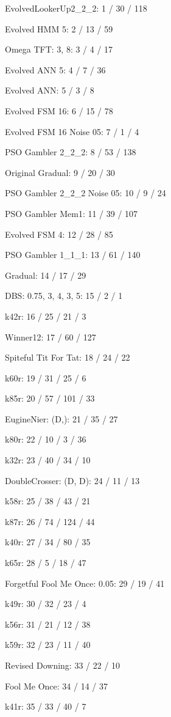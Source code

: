 \item EvolvedLookerUp2\_2\_2: 1 / 30 / 118
\item Evolved HMM 5: 2 / 13 / 59
\item Omega TFT: 3, 8: 3 / 4 / 17
\item Evolved ANN 5: 4 / 7 / 36
\item Evolved ANN: 5 / 3 / 8
\item Evolved FSM 16: 6 / 15 / 78
\item Evolved FSM 16 Noise 05: 7 / 1 / 4
\item PSO Gambler 2\_2\_2: 8 / 53 / 138
\item Original Gradual: 9 / 20 / 30
\item PSO Gambler 2\_2\_2 Noise 05: 10 / 9 / 24
\item PSO Gambler Mem1: 11 / 39 / 107
\item Evolved FSM 4: 12 / 28 / 85
\item PSO Gambler 1\_1\_1: 13 / 61 / 140
\item Gradual: 14 / 17 / 29
\item DBS: 0.75, 3, 4, 3, 5: 15 / 2 / 1
\item k42r: 16 / 25 / 21 / 3
\item Winner12: 17 / 60 / 127
\item Spiteful Tit For Tat: 18 / 24 / 22
\item k60r: 19 / 31 / 25 / 6
\item k85r: 20 / 57 / 101 / 33
\item EugineNier: (D,): 21 / 35 / 27
\item k80r: 22 / 10 / 3 / 36
\item k32r: 23 / 40 / 34 / 10
\item DoubleCrosser: (D, D): 24 / 11 / 13
\item k58r: 25 / 38 / 43 / 21
\item k87r: 26 / 74 / 124 / 44
\item k40r: 27 / 34 / 80 / 35
\item k65r: 28 / 5 / 18 / 47
\item Forgetful Fool Me Once: 0.05: 29 / 19 / 41
\item k49r: 30 / 32 / 23 / 4
\item k56r: 31 / 21 / 12 / 38
\item k59r: 32 / 23 / 11 / 40
\item Revised Downing: 33 / 22 / 10
\item Fool Me Once: 34 / 14 / 37
\item k41r: 35 / 33 / 40 / 7
